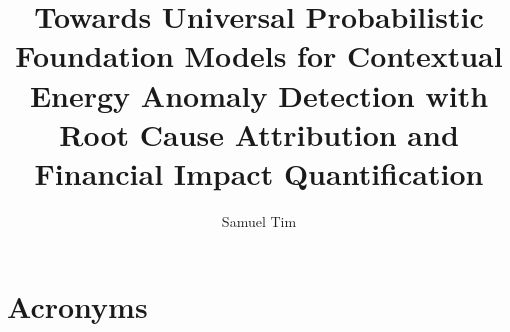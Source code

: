 \documentclass[]{htwg-report}
\begin{document}
\frontmatter



\title[Towards Universal Probabilistic Foundation Models for Contextual Energy Anomaly Detection with Root Cause Attribution and Financial Impact QuantificationTowards Universal Probabilistic Foundation Models for Contextual Energy Anomaly Detection with Root Cause Attribution and Financial Impact Quantification]{Towards Universal Probabilistic Foundation Models for Contextual Energy Anomaly Detection with Root Cause Attribution and Financial Impact Quantification}

\author{Samuel Tim}


\makecover[]
%          





\tableofcontents

\chapter*{Acronyms}


\mainmatter









\appendix



\printbibliography[heading=bibintoc]
\end{document}
